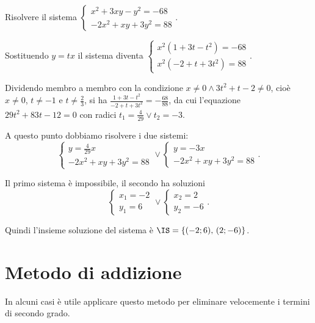 \begin{exrig}
\begin{esempio}
Risolvere il sistema $\left\{\begin{array}{l}x^2+3{xy}-y^2=-68 \\-2x^2+{xy}+3y^2=88 \end{array}\right.$.

Sostituendo $y={tx}$ il sistema diventa $\left\{\begin{array}{l}x^2(1+3t-t^2)=-68 \\x^2(-2+t+3t^2)=88 \end{array}\right.$.

Dividendo membro a membro con la condizione $x\neq 0\wedge 3t^2+t-2\neq 0$, cioè $x\neq 0$, $t\neq -1$ e $t\neq \frac 2 3$, si ha $\frac{1+3t-t^2}{-2+t+3t^2}=-\frac{68}{88}$, da cui l'equazione $29t^2+83t-12=0$ con radici $t_1=\frac 4{29}\vee t_2=-3$.

A questo punto dobbiamo risolvere i due sistemi:\[ \left\{\begin{array}{l}y=\frac 4{29}x \\-2x^2+{xy}+3y^2=88 \end{array}\right.\vee\left\{\begin{array}{l}y=-3x \\-2x^2+{xy}+3y^2=88 \end{array}\right.. \]

Il primo sistema è impossibile, il secondo ha soluzioni 
\[\left\{\begin{array}{l}x_1=-2\\y_1=6\end{array}\right.\vee\left\{\begin{array}{l}x_2=2\\y_2=-6\end{array}\right..\] 

Quindi l'insieme soluzione del sistema è $\IS=\{(-2;6)\text{, }(2;-6)\}$.
\end{esempio}
\end{exrig}
\ovalbox{\risolvii \ref{ese:6.48}, \ref{ese:6.49}, \ref{ese:6.50}, \ref{ese:6.51}, \ref{ese:6.52}, \ref{ese:6.53}, \ref{ese:6.54}, \ref{ese:6.55}, \ref{ese:6.56}, \ref{ese:6.57}, \ref{ese:6.58}, \ref{ese:6.59}, \ref{ese:6.60}}

\section{Metodo di addizione}

In alcuni casi è utile applicare questo metodo per eliminare velocemente i termini di secondo grado.

